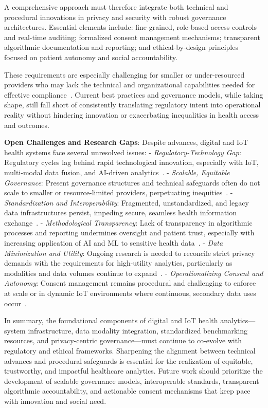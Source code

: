 \documentclass[sigconf]{acmart}
\begin{document}
A comprehensive approach must therefore integrate both technical and procedural innovations in privacy and security with robust governance architectures. Essential elements include: fine-grained, role-based access controls and real-time auditing; formalized consent management mechanisms; transparent algorithmic documentation and reporting; and ethical-by-design principles focused on patient autonomy and social accountability.

These requirements are especially challenging for smaller or under-resourced providers who may lack the technical and organizational capabilities needed for effective compliance~\cite{ref82,ref84,ref106}. Current best practices and governance models, while taking shape, still fall short of consistently translating regulatory intent into operational reality without hindering innovation or exacerbating inequalities in health access and outcomes.

\textbf{Open Challenges and Research Gaps}: Despite advances, digital and IoT health systems face several unresolved issues:
- \textit{Regulatory-Technology Gap}: Regulatory cycles lag behind rapid technological innovation, especially with IoT, multi-modal data fusion, and AI-driven analytics~\cite{ref83,ref84,ref90}.
- \textit{Scalable, Equitable Governance}: Present governance structures and technical safeguards often do not scale to smaller or resource-limited providers, perpetuating inequities~\cite{ref82,ref84,ref106}.
- \textit{Standardization and Interoperability}: Fragmented, unstandardized, and legacy data infrastructures persist, impeding secure, seamless health information exchange~\cite{ref82,ref83,ref84,ref51}.
- \textit{Methodological Transparency}: Lack of transparency in algorithmic processes and reporting undermines oversight and patient trust, especially with increasing application of AI and ML to sensitive health data~\cite{ref70,ref51,ref83,ref84}.
- \textit{Data Minimization and Utility}: Ongoing research is needed to reconcile strict privacy demands with the requirements for high-utility analytics, particularly as modalities and data volumes continue to expand~\cite{ref90,ref83}.
- \textit{Operationalizing Consent and Autonomy}: Consent management remains procedural and challenging to enforce at scale or in dynamic IoT environments where continuous, secondary data uses occur~\cite{ref84}.

In summary, the foundational components of digital and IoT health analytics—system infrastructure, data modality integration, standardized benchmarking resources, and privacy-centric governance—must continue to co-evolve with regulatory and ethical frameworks. Sharpening the alignment between technical advances and procedural safeguards is essential for the realization of equitable, trustworthy, and impactful healthcare analytics. Future work should prioritize the development of scalable governance models, interoperable standards, transparent algorithmic accountability, and actionable consent mechanisms that keep pace with innovation and social need.
\end{document}
